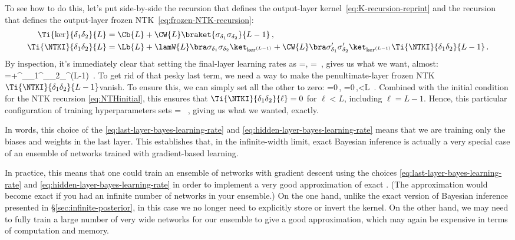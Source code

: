To see how to do this, let's put side-by-side the recursion  that defines the output-layer kernel~\eqref{eq:K-recursion-reprint} and the recursion that defines the output-layer frozen NTK~\eqref{eq:frozen-NTK-recursion}:
\begin{align}\label{eq:kernel-recursion-reminder-reprint}
\Ti{\ker}{\delta_1\delta_2}{L} &= \Cb{L} + \CW{L} \braket{\sigma_{\delta_1}\sigma_{\delta_2}}{L-1} \, , \\
\Ti{\NTKI}{\delta_1\delta_2}{L}&=\Lb{L} + \lamW{L}\bra\sigma_{\delta_1}\sigma_{\delta_2}\ket_{\ker^{(L-1)}}+\CW{L}\bra\sigma^{\prime}_{\delta_1}\sigma^{\prime}_{\delta_2}\ket_{\ker^{(L-1)}}\Ti{\NTKI}{\delta_1\delta_2}{L-1}\, .
\label{eq:NTK-recursion-reminder-reprint}
\end{align}
By inspection, it's immediately clear that setting the final-layer learning rates as
\be\label{eq:last-layer-bayes-learning-rate}
=, \qquad {}=\, ,
\ee
gives us what we want, almost:
\be
{}=+\bra\sigma^{\prime}_{\delta_1}\sigma^{\prime}_{\delta_2}\ket_{\ker^{(L-1)}}\, .
\ee
To get rid of that pesky last term, we need a way to make the penultimate-layer frozen NTK $\Ti{\NTKI}{\delta_1\delta_2}{L-1}$vanish. To ensure this,  we can simply set all the other  to zero:
\be\label{eq:hidden-layer-bayes-learning-rate}
\Lb{\ell}=0\,, \qquad \LW{\ell}=0\,,\qquad {}\quad \ell <L\, .
\ee
Combined with the initial condition for the NTK recursion \eqref{eq:NTHinitial}, this ensures that $\Ti{\NTKI}{\delta_1\delta_2}{\ell} = 0$ for $\ell <L$, including $\ell=L-1$. Hence, this particular configuration of training hyperparameters sets 
\be
{}= \, ,
\ee
giving us what we wanted, exactly. 




In words, this choice of the  \eqref{eq:last-layer-bayes-learning-rate} and \eqref{eq:hidden-layer-bayes-learning-rate} means that we are training only the biases and weights in the last layer.
This establishes that, in the infinite-width limit, exact Bayesian inference is actually a very special case of an ensemble of networks trained with gradient-based learning.

In practice, this means that one could train an ensemble of networks with gradient descent using the  choices \eqref{eq:last-layer-bayes-learning-rate} and \eqref{eq:hidden-layer-bayes-learning-rate} in order to implement a very good approximation of exact . (The approximation would become exact if you had an infinite number of networks in your ensemble.) On the one hand,
unlike the exact version of Bayesian inference presented in \S\ref{sec:infinite-posterior},
in this case we no longer need to explicitly store or invert the kernel. On the other hand, we may need to fully train a large number of very wide networks for our ensemble to give a good approximation, which may again be expensive in terms of computation and memory.




